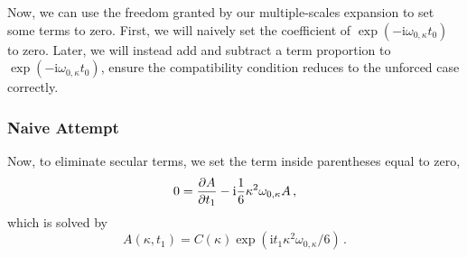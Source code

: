 \documentclass{jfm}
\let\Oldsubsubsection\subsubsection
\renewcommand{\subsubsection}{\FloatBarrier\Oldsubsubsection}
\newcommand{\im}{\mathrm{i}}
\begin{document}
Now, we can use the freedom granted by our multiple-scales expansion to
set some terms to zero.
First, we will naively set the coefficient of $\exp(-\im
\omega_{0,\kappa} t_0)$ to zero.
Later, we will instead add and subtract a term proportion to $\exp(-\im
\omega_{0,\kappa} t_0)$, ensure the compatibility condition reduces to
the unforced case correctly.

\subsubsection{Naive Attempt}
Now, to eliminate secular terms, we set the term inside parentheses
equal to zero,
\begin{equation}
  0 = \pdv{A}{t_1} - \im \frac{1}{6} \kappa^2 \omega_{0,\kappa} A \,,
\end{equation}
which is solved by
\begin{equation}
  A(\kappa, t_1) =  C(\kappa) \exp(\im t_1 \kappa^2 \omega_{0,\kappa}/6) \,.
  \label{eq:A_strong_sol2}
\end{equation}
\end{document}
